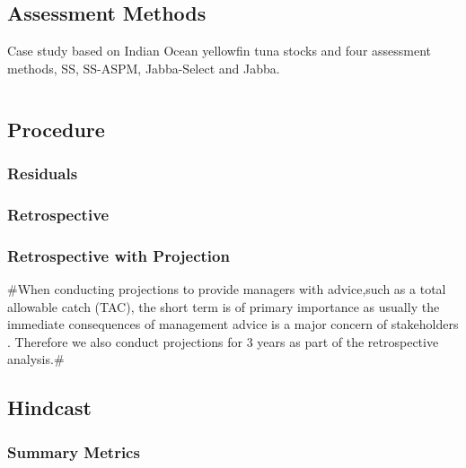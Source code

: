 \documentclass[a4paper]{article}
\begin{document}
\subsection{Assessment Methods}

Case study based on Indian Ocean yellowfin tuna stocks and four assessment methods, SS, SS-ASPM, Jabba-Select and Jabba. 

\begin{verbatim}\end{verbatim}

\subsection{Procedure}

\subsubsection{Residuals}

%

\subsubsection{Retrospective}


%

\subsubsection{Retrospective with Projection}
#When conducting projections to provide managers with advice,such as a total allowable catch (TAC), the short term is of primary importance as usually the immediate consequences of management advice is a major concern of stakeholders \citep{fricker2013three}. Therefore we also conduct projections for 3 years as part of the retrospective analysis.#


\subsection{Hindcast}

%

\subsubsection{Summary Metrics}
\end{document}
